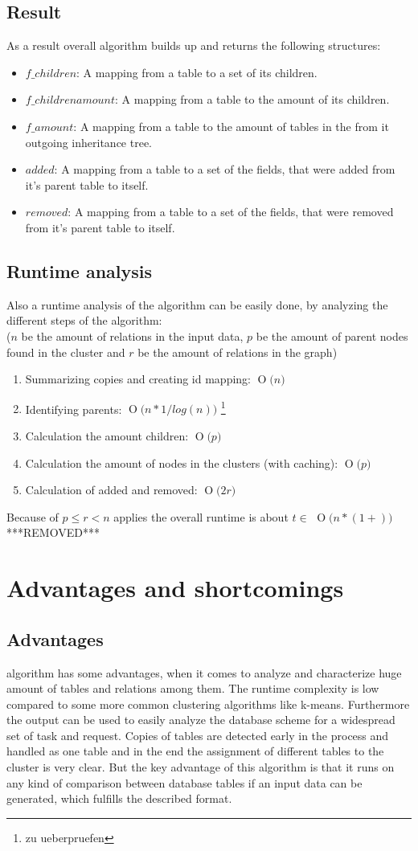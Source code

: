 \documentclass[10pt, journal, twocolumn]{IEEEtran}
\newcommand{\BigO}[1]{\ensuremath{\operatorname{O}\bigl(#1\bigr)}}
\begin{document}
\subsection{Result}
As a result overall algorithm builds up and returns the following structures:
\begin{itemize}
\item $f\_children$: A mapping from a table to a set of its children.
\item $f\_childrenamount$: A mapping from a table to the amount of its children.
\item $f\_amount$: A mapping from a table to the amount of tables in the from it outgoing inheritance tree.
\item $added$: A mapping from a table to a set of the fields, that were added from it's parent table to itself.
\item $removed$: A mapping from a table to a set of the fields, that were removed from it's parent table to itself.
\end{itemize}
\subsection{Runtime analysis}
Also a runtime analysis of the algorithm can be easily done, by analyzing the different steps of the algorithm:\\($n$ be the amount of relations in the input data, $p$ be the amount of parent nodes found in the cluster and $r$ be the amount of relations in the graph)
\begin{enumerate}
\item Summarizing copies and creating id mapping: \BigO{n}
\item Identifying parents: \BigO{n*1/log(n)} \footnote{zu ueberpruefen}
\item Calculation the amount children: \BigO{p}
\item Calculation the amount of nodes in the clusters (with caching): \BigO{p}
\item Calculation of added and removed: \BigO{2r}
\end{enumerate}
Because of $p \le r < n$ applies the overall runtime is about $ t \in $ \BigO{n* (1+ )}
***REMOVED***
\section{Advantages and shortcomings}
\subsection{Advantages}
 algorithm has some advantages, when it comes to analyze and characterize huge amount of tables and relations among them. The runtime complexity is low compared to some more common clustering algorithms like k-means. Furthermore the output can be used to easily analyze the database scheme for a widespread set of task and request. Copies of tables are detected early in the process and handled as one table and in the end the assignment of different tables to the cluster is very clear. But the key advantage of this algorithm is that it runs on any kind of comparison between database tables if an input data can be generated, which fulfills the described format.
\end{document}
